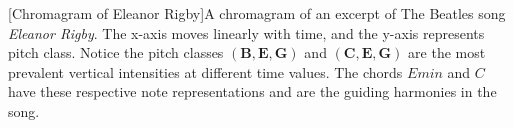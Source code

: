 [Chromagram of Eleanor Rigby]A chromagram of an excerpt of The Beatles song \textit{Eleanor Rigby}. The x-axis moves linearly with time, and the y-axis represents pitch class. Notice the pitch classes $(\textbf{B}, \textbf{E}, \textbf{G})$ and $(\textbf{C}, \textbf{E}, \textbf{G})$ are the most prevalent vertical intensities at different time values. The chords $Emin$ and $C$ have these respective note representations and are the guiding harmonies in the song.